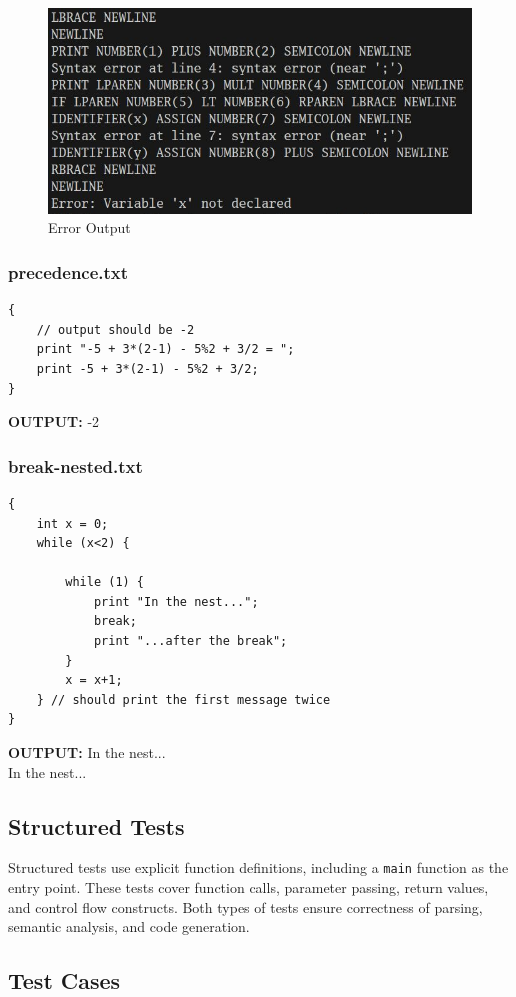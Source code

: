 \documentclass{article}
\begin{document}
        \begin{figure} [h]
            \centering
            \includegraphics[width=0.35\linewidth]{assets/results/errors.png}
            \caption{Error Output}
            \label{fig:enter-label}
        \end{figure}

    \subsubsection*{precedence.txt}
    \begin{lstlisting}
{
    // output should be -2
    print "-5 + 3*(2-1) - 5%2 + 3/2 = ";
    print -5 + 3*(2-1) - 5%2 + 3/2;
}
    \end{lstlisting}
    \textbf{OUTPUT:} -2

    \subsubsection*{break-nested.txt}
        \begin{lstlisting}
{
    int x = 0;
    while (x<2) {
    
        while (1) {
            print "In the nest...";
            break;
            print "...after the break";
        }
        x = x+1;
    } // should print the first message twice
}
    \end{lstlisting}
    \textbf{OUTPUT:} In the nest... \\ \hspace*{5.7em}In the nest...

    \newpage
    \subsection{Structured Tests} 
    Structured tests use explicit function definitions, including a \texttt{main} function as the entry point. These tests cover function calls, parameter passing, return values, and control flow constructs. Both types of tests ensure correctness of parsing, semantic analysis, and code generation.

    \subsection*{Test Cases}
\end{document}
